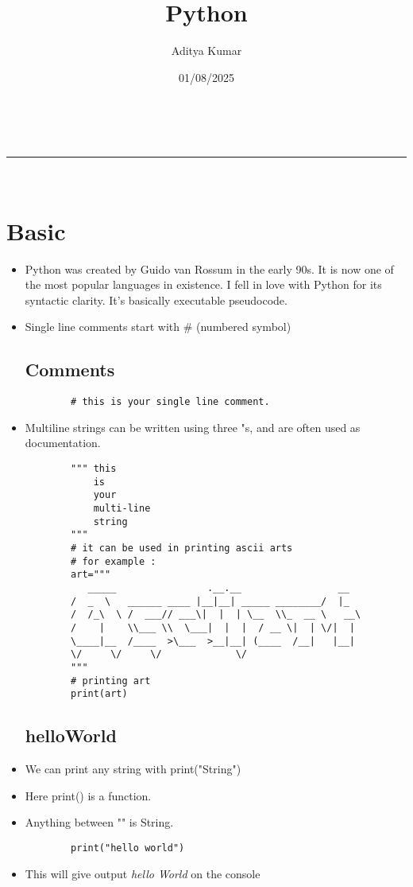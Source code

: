 \documentclass[a4paper,11pt]{article}
\makeatletter
\newcommand{\linia}{\rule{\linewidth}{0.5pt}}
\theoremstyle{mytheor}
\renewcommand{\maketitle}{
\begin{center}
\vspace{2ex}
{\huge \textsc{\@title}}
\vspace{1ex}
\\
\linia\\
\@author \hfill \@date
\vspace{4ex}
\end{center}
}
\makeatother
\begin{document}
\title{Python}

\author{Aditya Kumar}

\date{01/08/2025}

\maketitle
	
\section{Basic}

\begin{itemize}
	\item Python was created by Guido van Rossum in the early 90s. It is now one of the most popular languages in existence. I fell in love with Python for its syntactic clarity. It's basically executable pseudocode.
	\item Single line comments start with \# (numbered symbol)
	
	\subsection{Comments}
	\begin{lstlisting}
		# this is your single line comment.
	\end{lstlisting}
	
	\item Multiline strings can be written
	using three "s, and are often used
	as documentation.
	
	\begin{lstlisting}
		""" this
			is
			your
			multi-line
			string
		"""
		# it can be used in printing ascii arts
		# for example :
		art="""
		   _____                .__.__                 __   
		/  _  \   ______ ____ |__|__| _____ ________/  |_ 
		/  /_\  \ /  ___// ___\|  |  | \__  \\_  __ \   __\
		/    |    \\___ \\  \___|  |  |  / __ \|  | \/|  |  
		\____|__  /____  >\___  >__|__| (____  /__|   |__|  
		\/     \/     \/             \/             
		"""
		# printing art
		print(art)
	\end{lstlisting}
	\subsection{helloWorld}
	\item We can print any string with print("String")
	\item Here print() is a function.
	\item Anything between "" is String.
	\begin{lstlisting}
		print("hello world")
	\end{lstlisting}
	\item This will give output \textit{hello World} on the console
	

\end{itemize}
\end{document}
